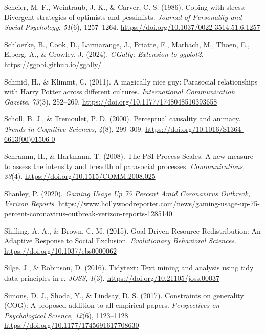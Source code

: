 \documentclass[
]{udthesis}
\newlength{\cslhangindent}
\newenvironment{CSLReferences}[2] %
 {\begin{list}{}{%
  \setlength{\itemindent}{0pt}
  \setlength{\leftmargin}{0pt}
  \setlength{\parsep}{0pt}
  \ifodd #1
   \setlength{\leftmargin}{\cslhangindent}
   \setlength{\itemindent}{-1\cslhangindent}
  \fi
  \setlength{\itemsep}{#2\baselineskip}}}
 {\end{list}}
\begin{document}
\begin{CSLReferences}{1}{0}
Scheier, M. F., Weintraub, J. K., \& Carver, C. S. (1986). Coping with stress: {Divergent} strategies of optimists and pessimists. \emph{Journal of Personality and Social Psychology}, \emph{51}(6), 1257--1264. \url{https://doi.org/10.1037/0022-3514.51.6.1257}

Schloerke, B., Cook, D., Larmarange, J., Briatte, F., Marbach, M., Thoen, E., Elberg, A., \& Crowley, J. (2024). \emph{GGally: Extension to ggplot2}. \url{https://ggobi.github.io/ggally/}

Schmid, H., \& Klimmt, C. (2011). A magically nice guy: Parasocial relationships with Harry Potter across different cultures. \emph{International Communication Gazette}, \emph{73}(3), 252--269. \url{https://doi.org/10.1177/1748048510393658}

Scholl, B. J., \& Tremoulet, P. D. (2000). Perceptual causality and animacy. \emph{Trends in Cognitive Sciences}, \emph{4}(8), 299--309. \url{https://doi.org/10.1016/S1364-6613(00)01506-0}

Schramm, H., \& Hartmann, T. (2008). The {PSI}-{Process Scales}. {A} new measure to assess the intensity and breadth of parasocial processes. \emph{Communications}, \emph{33}(4). \url{https://doi.org/10.1515/COMM.2008.025}

Shanley, P. (2020). \emph{Gaming Usage Up 75 Percent Amid Coronavirus Outbreak, Verizon Reports}. \url{https://www.hollywoodreporter.com/news/gaming-usage-up-75-percent-coronavirus-outbreak-verizon-reports-1285140}

Shilling, A. A., \& Brown, C. M. (2015). Goal-Driven Resource Redistribution: An Adaptive Response to Social Exclusion. \emph{Evolutionary Behavioral Sciences}. \url{https://doi.org/10.1037/ebs0000062}

Silge, J., \& Robinson, D. (2016). Tidytext: Text mining and analysis using tidy data principles in r. \emph{JOSS}, \emph{1}(3). \url{https://doi.org/10.21105/joss.00037}

Simons, D. J., Shoda, Y., \& Lindsay, D. S. (2017). Constraints on generality (COG): A proposed addition to all empirical papers. \emph{Perspectives on Psychological Science}, \emph{12}(6), 1123--1128. \url{https://doi.org/10.1177/1745691617708630}


\end{CSLReferences}
\end{document}
